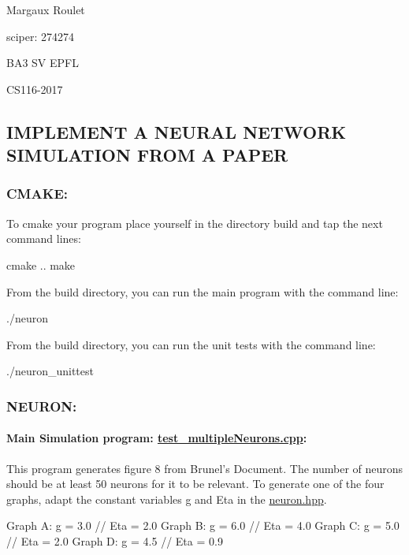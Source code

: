 Margaux Roulet

sciper\-: 274274

B\-A3 S\-V E\-P\-F\-L

C\-S116-\/2017

\subsection*{I\-M\-P\-L\-E\-M\-E\-N\-T A N\-E\-U\-R\-A\-L N\-E\-T\-W\-O\-R\-K S\-I\-M\-U\-L\-A\-T\-I\-O\-N F\-R\-O\-M A P\-A\-P\-E\-R}

\subsubsection*{C\-M\-A\-K\-E\-:}

To cmake your program place yourself in the directory build and tap the next command lines\-: \begin{DoxyVerb}    cmake ..
    make
\end{DoxyVerb}


From the build directory, you can run the main program with the command line\-: \begin{DoxyVerb}    ./neuron
\end{DoxyVerb}


From the build directory, you can run the unit tests with the command line\-: \begin{DoxyVerb}    ./neuron_unittest
\end{DoxyVerb}


\subsubsection*{N\-E\-U\-R\-O\-N\-:}

\paragraph*{Main Simulation program\-: \hyperlink{test__multipleNeurons_8cpp}{test\-\_\-multiple\-Neurons.\-cpp}\-:}

This program generates figure 8 from Brunel's Document. The number of neurons should be at least 50 neurons for it to be relevant. To generate one of the four graphs, adapt the constant variables g and Eta in the \hyperlink{neuron_8hpp}{neuron.\-hpp}. \begin{DoxyVerb}    Graph A: g = 3.0 // Eta = 2.0 
    Graph B: g = 6.0 // Eta = 4.0 
    Graph C: g = 5.0 // Eta = 2.0
    Graph D: g = 4.5 // Eta = 0.9   
\end{DoxyVerb}


